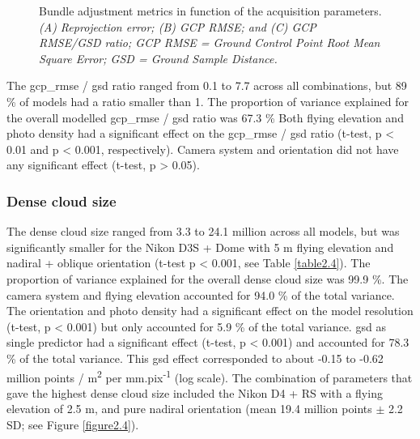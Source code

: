 \begin{figure}[ht]
	\caption[Bundle adjustment metrics in function of the acquisition parameters.]{Bundle adjustment metrics in function of the acquisition parameters. \textit{(A) Reprojection error; (B) GCP RMSE; and (C) GCP RMSE/GSD ratio; GCP RMSE = Ground Control Point Root Mean Square Error; GSD = Ground Sample Distance.}}
	\label{figure2.3}
    
\end{figure}

The \acrshort{gcp_rmse} / \acrshort{gsd} ratio ranged from 0.1 to 7.7 across all combinations, but 89 \% of models had a ratio smaller than 1. The proportion of variance explained for the overall modelled \acrshort{gcp_rmse} / \acrshort{gsd} ratio was 67.3 \% Both flying elevation and photo density had a significant effect on the \acrshort{gcp_rmse} / \acrshort{gsd} ratio (t-test, p < 0.01 and p < 0.001, respectively). Camera system and orientation did not have any significant effect (t-test, p > 0.05).
\subsubsection{Dense cloud size}\label{chapitre2_3.1.2}
The dense cloud size ranged from 3.3 to 24.1 million across all models, but was significantly smaller for the Nikon D3S + Dome with 5 m flying elevation and nadiral + oblique orientation (t-test p < 0.001, see Table \ref{table2.4}). The proportion of variance explained for the overall dense cloud size was 99.9 \%. The camera system and flying elevation accounted for 94.0 \% of the total variance. The orientation and photo density had a significant effect on the model resolution (t-test, p < 0.001) but only accounted for 5.9 \% of the total variance. \acrshort{gsd} as single predictor had a significant effect (t-test, p < 0.001) and accounted for 78.3 \% of the total variance. This \acrshort{gsd} effect corresponded to about -0.15 to -0.62 million points / m\textsuperscript{2} per mm.pix\textsuperscript{-1} (log scale). The combination of parameters that gave the highest dense cloud size included the Nikon D4 + RS with a flying elevation of 2.5 m, and pure nadiral orientation (mean 19.4 million points $\pm$ 2.2 SD; see Figure \ref{figure2.4}).

